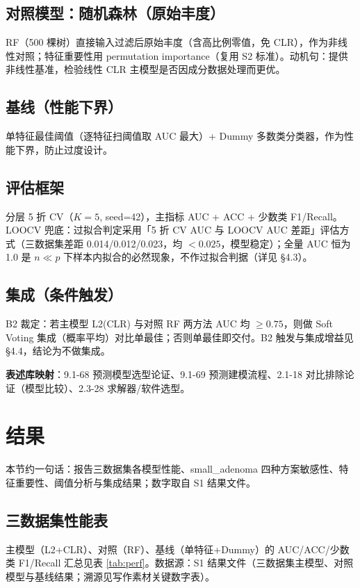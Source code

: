\documentclass{internal-report}
\begin{document}
\subsection{对照模型：随机森林（原始丰度）}
RF（500 棵树）直接输入过滤后原始丰度（含高比例零值，免 CLR），作为非线性对照；特征重要性用 permutation importance（复用 S2 标准）。动机句：提供非线性基准，检验线性 CLR 主模型是否因成分数据处理而更优。

\subsection{基线（性能下界）}
单特征最佳阈值（逐特征扫阈值取 AUC 最大）+ Dummy 多数类分类器，作为性能下界，防止过度设计。

\subsection{评估框架}
分层 5 折 CV（$K=5$, seed=42），主指标 AUC + ACC + 少数类 F1/Recall。LOOCV 兜底：过拟合判定采用「5 折 CV AUC 与 LOOCV AUC 差距」评估方式（三数据集差距 0.014/0.012/0.023，均 $<0.025$，模型稳定）；全量 AUC 恒为 1.0 是 $n\ll p$ 下样本内拟合的必然现象，不作过拟合判据（详见 §4.3）。

\subsection{集成（条件触发）}
B2 裁定：若主模型 L2(CLR) 与对照 RF 两方法 AUC 均 $\geq 0.75$，则做 Soft Voting 集成（概率平均）对比单最佳；否则单最佳即交付。B2 触发与集成增益见 §4.4，结论为不做集成。

\textbf{表述库映射}：9.1-68 预测模型选型论证、9.1-69 预测建模流程、2.1-18 对比排除论证（模型比较）、2.3-28 求解器/软件选型。

\section{结果}
\label{sec:result}

本节约一句话：报告三数据集各模型性能、small\_adenoma 四种方案敏感性、特征重要性、阈值分析与集成结果；数字取自 S1 结果文件。

\subsection{三数据集性能表}
主模型（L2+CLR）、对照（RF）、基线（单特征+Dummy）的 AUC/ACC/少数类 F1/Recall 汇总见表 \ref{tab:perf}。数据源：S1 结果文件（三数据集主模型、对照模型与基线结果；溯源见写作素材关键数字表）。
\end{document}
